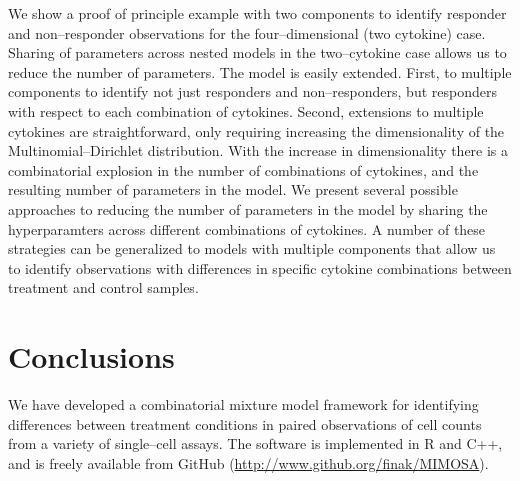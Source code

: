 \documentclass[11pt]{article}
\begin{document}
We show a proof of principle example with two components to identify responder and non--responder observations for the four--dimensional (two cytokine) case. Sharing of parameters across nested models in the two--cytokine case allows us to reduce the number of parameters. The model is easily extended. First, to multiple components to identify not just responders and non--responders, but responders with respect to each combination of cytokines. Second, extensions to multiple cytokines are straightforward, only requiring increasing the dimensionality of the Multinomial--Dirichlet distribution. With the increase in dimensionality there is a combinatorial explosion in the number of combinations of cytokines, and the resulting number of parameters in the model. We present several possible approaches to reducing the number of parameters in the model by sharing the hyperparamters across different combinations of cytokines. A number of these strategies can be generalized to models with multiple components that allow us to identify observations with differences in specific cytokine combinations between treatment and control samples.

\section{Conclusions}
We have developed a combinatorial mixture model framework for identifying differences between treatment conditions in paired observations of cell counts from a variety of single--cell assays. The software is implemented in R and C++, and is freely available from GitHub (\url{http://www.github.org/finak/MIMOSA}). 
\end{document}
